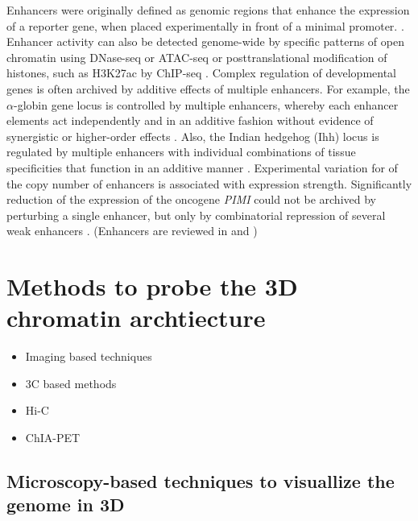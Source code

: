 \documentclass[a4paper,twoside=true,openright,parskip=full,chapterprefix=true,11pt,headings=normal,bibliography=totoc,listof=totoc,titlepage=on,captions=tableabove,draft=false]{scrreprt}
\providecommand{\tightlist}{%
  \setlength{\itemsep}{0pt}\setlength{\parskip}{0pt}}
\theoremstyle{definition}
\theoremstyle{definition}
\theoremstyle{definition}
\theoremstyle{remark}
\begin{document}
Enhancers were originally defined as genomic regions that enhance the
expression of a reporter gene, when placed experimentally in front of a
minimal promoter. \citep{Banerji1981, Shlyueva2014}. Enhancer activity
can also be detected genome-wide by specific patterns of open chromatin
using DNase-seq \citep{Song2010} or ATAC-seq \citep{Buenrostro2013} or
posttranslational modification of histones, such as H3K27ac by ChIP-seq
\citep{Creyghton2010}. Complex regulation of developmental genes is
often archived by additive effects of multiple enhancers. For example,
the \(\alpha\)-globin gene locus is controlled by multiple enhancers,
whereby each enhancer elements act independently and in an additive
fashion without evidence of synergistic or higher-order effects
\citep{Hay2016}. Also, the Indian hedgehog (Ihh) locus is regulated by
multiple enhancers with individual combinations of tissue specificities
that function in an additive manner \citep{Will2017}. Experimental
variation for of the copy number of enhancers is associated with
expression strength. Significantly reduction of the expression of the
oncogene \emph{PIMI} could not be archived by perturbing a single
enhancer, but only by combinatorial repression of several weak enhancers
\citep{Xie2017}. (Enhancers are reviewed in \citep{Spitz2012} and
\citep{Andrey2017})

\section{Methods to probe the 3D chromatin
archtiecture}\label{methods-to-probe-the-3d-chromatin-archtiecture}

\begin{itemize}
\tightlist
\item
  Imaging based techniques
\item
  3C based methods
\item
  Hi-C
\item
  ChIA-PET
\end{itemize}

\subsection{Microscopy-based techniques to visuallize the genome in
3D}\label{microscopy-based-techniques-to-visuallize-the-genome-in-3d}
\end{document}
